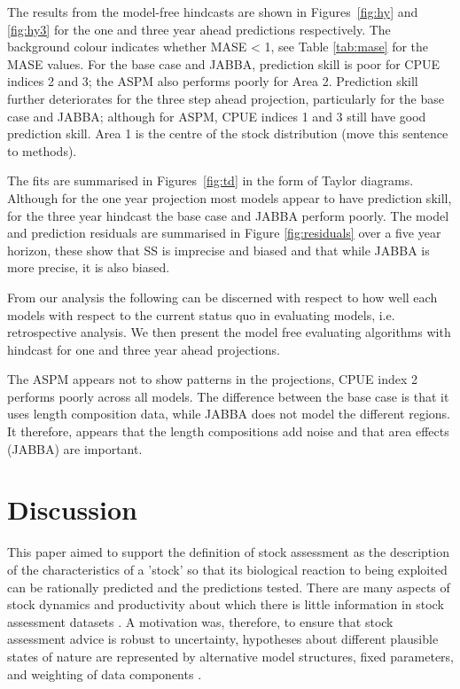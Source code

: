 \documentclass[12pt,halfline,a4paper,nonumbib]{ouparticle}
\begin{document}
The results from the model-free hindcasts are shown in Figures~\ref{fig:hy} and \ref{fig:hy3} for the one and three year ahead predictions respectively. The background colour indicates whether MASE < 1, see Table \ref{tab:mase} for the MASE values. For the base case and JABBA, prediction skill is poor for CPUE indices 2 and 3; the ASPM also performs poorly for Area 2. Prediction skill further deteriorates for the three step ahead projection, particularly for the base case and JABBA; although for ASPM, CPUE indices 1 and 3 still have good prediction skill. Area 1 is the centre of the stock distribution (move this sentence to methods).

The fits are summarised in Figures~\ref{fig:td} in the form of Taylor diagrams. Although for the one year projection most models appear to have prediction skill, for the three year hindcast the base case and JABBA perform poorly. The model and prediction residuals are summarised in Figure \ref{fig:residuals} over a five year horizon, these show that SS is imprecise and biased and that while JABBA is more precise, it is also biased.

From our analysis the following can be discerned with respect to how well each models with respect to the current status quo in evaluating models, i.e. retrospective analysis. We then present the model free evaluating algorithms with hindcast for one and three year ahead projections. 

The ASPM appears not to show patterns in the projections, CPUE index 2 performs poorly across all models. The difference between the base case is that it uses length composition data, while JABBA does not model the different regions. It therefore, appears that the length compositions add noise and that area effects (JABBA) are important. 


\section{Discussion}

This paper aimed to support the definition of stock assessment as the description of the characteristics of a ’stock’ so that its biological reaction to being exploited can be rationally predicted and the predictions tested. There are many aspects of stock dynamics and productivity about which there is little information in stock assessment datasets \parencite[e.g.][]{lee2011m,lee2012steepness, jiao2012modelling,simon2012effects,pepin2015reconsidering,cury2014resolving}. A motivation was, therefore, to ensure that stock assessment advice is robust to uncertainty, hypotheses about different plausible states of nature are represented by alternative model structures, fixed parameters, and weighting of data components \parencite[][]{sharma2020trfmo}. 
\end{document}

